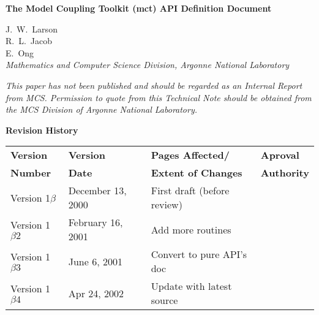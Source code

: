 \documentclass{article}
\begin{document}
\begin{sloppypar}
{\huge\bf
The Model Coupling Toolkit (mct) API Definition Document
\\ }                     %
\end{sloppypar}

\vspace{.3in}
J.~W.~Larson\\
R.~L.~Jacob\\
E.~Ong\\
\vspace{.2in} {\em Mathematics and Computer Science Division,
Argonne National Laboratory\\}

\vfill

{\em This paper has not been published and should  be regarded as
an Internal Report from MCS. Permission to quote from this
Technical Note should be  obtained from the MCS Division of
Argonne National Laboratory.}

\vspace{0.4in}


\thispagestyle{empty}
\newpage




\newpage
\setcounter{page}{2}     %


\vspace*{\fill}

\centerline{\huge\bf Revision History}

\bigskip
{}

\begin{center}
\begin{tabular}{|l|l|l|l|}\hline
{\bf Version} & {\bf Version} & {\bf Pages Affected/}   & {\bf Aproval}\\
{\bf Number}  & {\bf Date}    & {\bf Extent of Changes} & {\bf Authority}\\
\hline
\hline 
Version 1$\beta$ & December 13, 2000      & First draft (before review) &
\\\hline
Version 1$\beta2$ & February 16, 2001      & Add more routines &
\\\hline
Version 1$\beta3$ & June 6, 2001      & Convert to pure API's doc &
\\\hline
Version 1$\beta4$ & Apr 24, 2002      & Update with latest source &
\\\hline
\end{tabular}
\end{center}
\end{document}
